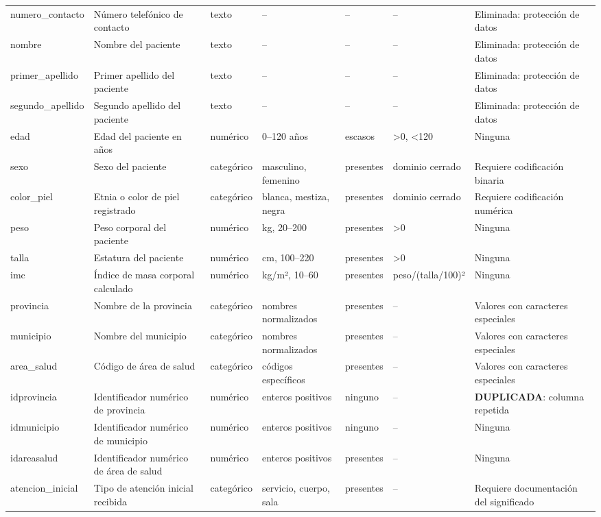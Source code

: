 \documentclass[11pt,a4paper]{article}
\begin{document}
\begin{longtable}{@{}L{0.095\textwidth} L{0.17\textwidth} L{0.07\textwidth} L{0.16\textwidth} L{0.14\textwidth} L{0.13\textwidth} L{0.15\textwidth}@{}}
numero\_contacto & Número telefónico de contacto & texto & -- & -- & -- & Eliminada: protección de datos \\
nombre & Nombre del paciente & texto & -- & -- & -- & Eliminada: protección de datos \\
primer\_apellido & Primer apellido del paciente & texto & -- & -- & -- & Eliminada: protección de datos \\
segundo\_apellido & Segundo apellido del paciente & texto & -- & -- & -- & Eliminada: protección de datos \\
edad & Edad del paciente en años & numérico & 0--120 años & escasos & >0, <120 & Ninguna \\
sexo & Sexo del paciente & categórico & masculino, femenino & presentes & dominio cerrado & Requiere codificación binaria \\
color\_piel & Etnia o color de piel registrado & categórico & blanca, mestiza, negra & presentes & dominio cerrado & Requiere codificación numérica \\
peso & Peso corporal del paciente & numérico & kg, 20--200 & presentes & >0 & Ninguna \\
talla & Estatura del paciente & numérico & cm, 100--220 & presentes & >0 & Ninguna \\
imc & Índice de masa corporal calculado & numérico & kg/m², 10--60 & presentes & peso/(talla/100)² & Ninguna \\
provincia & Nombre de la provincia & categórico & nombres normalizados & presentes & -- & Valores con caracteres especiales \\
municipio & Nombre del municipio & categórico & nombres normalizados & presentes & -- & Valores con caracteres especiales \\
area\_salud & Código de área de salud & categórico & códigos específicos & presentes & -- & Valores con caracteres especiales \\
idprovincia & Identificador numérico de provincia & numérico & enteros positivos & ninguno & -- & \textbf{DUPLICADA}: columna repetida \\
idmunicipio & Identificador numérico de municipio & numérico & enteros positivos & ninguno & -- & Ninguna \\
idareasalud & Identificador numérico de área de salud & numérico & enteros positivos & presentes & -- & Ninguna \\
atencion\_inicial & Tipo de atención inicial recibida & categórico & servicio, cuerpo, sala & presentes & -- & Requiere documentación del significado \\

\end{longtable}
\end{document}
